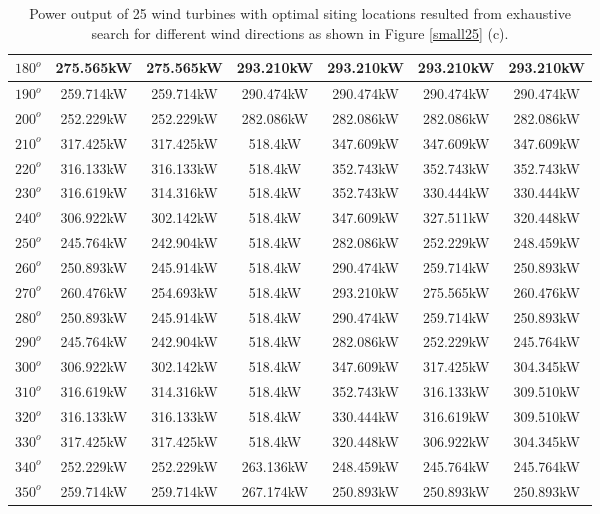 \begin{table}[H]
\begin{tabular}{|c|c|c|c|c|c|c|}
		$180^o$	& 275.565kW	& 275.565kW	& 293.210kW	& 293.210kW	& 293.210kW	& 293.210kW	\\ \hline
		$190^o$	& 259.714kW	& 259.714kW	& 290.474kW	& 290.474kW	& 290.474kW	& 290.474kW	\\ \hline
		$200^o$	& 252.229kW	& 252.229kW	& 282.086kW	& 282.086kW	& 282.086kW	& 282.086kW	\\ \hline
		$210^o$	& 317.425kW	& 317.425kW	& 518.4kW	& 347.609kW	& 347.609kW	& 347.609kW	\\ \hline
		$220^o$	& 316.133kW	& 316.133kW	& 518.4kW	& 352.743kW	& 352.743kW	& 352.743kW	\\ \hline
		$230^o$	& 316.619kW	& 314.316kW	& 518.4kW	& 352.743kW	& 330.444kW	& 330.444kW	\\ \hline
		$240^o$	& 306.922kW	& 302.142kW	& 518.4kW	& 347.609kW	& 327.511kW	& 320.448kW	\\ \hline
		$250^o$	& 245.764kW	& 242.904kW	& 518.4kW	& 282.086kW	& 252.229kW	& 248.459kW	\\ \hline
		$260^o$	& 250.893kW	& 245.914kW	& 518.4kW	& 290.474kW	& 259.714kW	& 250.893kW	\\ \hline
		$270^o$	& 260.476kW	& 254.693kW	& 518.4kW	& 293.210kW	& 275.565kW	& 260.476kW	\\ \hline
		$280^o$	& 250.893kW	& 245.914kW	& 518.4kW	& 290.474kW	& 259.714kW	& 250.893kW	\\ \hline
		$290^o$	& 245.764kW	& 242.904kW	& 518.4kW	& 282.086kW	& 252.229kW	& 245.764kW	\\ \hline
		$300^o$	& 306.922kW	& 302.142kW	& 518.4kW	& 347.609kW	& 317.425kW	& 304.345kW	\\ \hline
		$310^o$	& 316.619kW	& 314.316kW	& 518.4kW	& 352.743kW	& 316.133kW	& 309.510kW	\\ \hline
		$320^o$	& 316.133kW	& 316.133kW	& 518.4kW	& 330.444kW	& 316.619kW	& 309.510kW	\\ \hline
		$330^o$	& 317.425kW	& 317.425kW	& 518.4kW	& 320.448kW	& 306.922kW	& 304.345kW	\\ \hline
		$340^o$	& 252.229kW	& 252.229kW	& 263.136kW	& 248.459kW	& 245.764kW	& 245.764kW	\\ \hline
		$350^o$	& 259.714kW	& 259.714kW	& 267.174kW	& 250.893kW	& 250.893kW	& 250.893kW	\\ \hline
        	\end{tabular}
        	\caption{Power output of 25 wind turbines with optimal siting locations resulted from exhaustive search for different wind directions as shown in Figure \ref{small25} (c).}
        	\label{table25c}
        \end{table}
